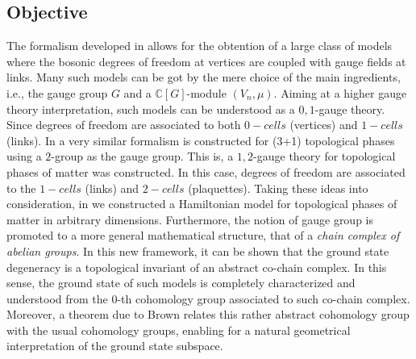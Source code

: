 \documentclass[titlepage,11pt]{article}
\theoremstyle{plain}%
\theoremstyle{definition}
\theoremstyle{remark}
\begin{document}
\subsection{Objective}\label{Ss:1}
The formalism developed in \cite{pramod} allows for the obtention of a large class of models where the bosonic degrees of freedom at vertices are coupled with gauge fields at links. Many such models can be got by the mere choice of the main ingredients, i.e., the gauge group $G$ and a $\mathbb{C}[G]$-module $(V_n, \mu)$. Aiming at a higher gauge theory interpretation, such models can be understood as a $0,1$-gauge theory. Since degrees of freedom are associated to both $0-cells$ (vertices) and $1-cells$ (links). In \cite{kazuothesis,ricardo} a very similar formalism is constructed for (3+1) topological phases using a $2$-group as the gauge group. This is, a $1,2$-gauge theory for topological phases of matter was constructed. In this case, degrees of freedom are associated to the $1-cells$ (links) and $2-cells$ (plaquettes). Taking these ideas into consideration, in \cite{higher} we constructed a Hamiltonian model for topological phases of matter in arbitrary dimensions. Furthermore, the notion of gauge group is promoted to a more general mathematical structure, that of a \textit{chain complex of abelian groups}. In this new framework, it can be shown \cite{higher} that the ground state degeneracy is a topological invariant of an abstract co-chain complex. In this sense, the ground state of such models is completely characterized and understood from the $0$-th cohomology group associated to such co-chain complex. Moreover, a theorem due to Brown \cite{Brown} relates this rather abstract cohomology group with the usual cohomology groups, enabling for a natural geometrical interpretation of the ground state subspace. 
\end{document}
